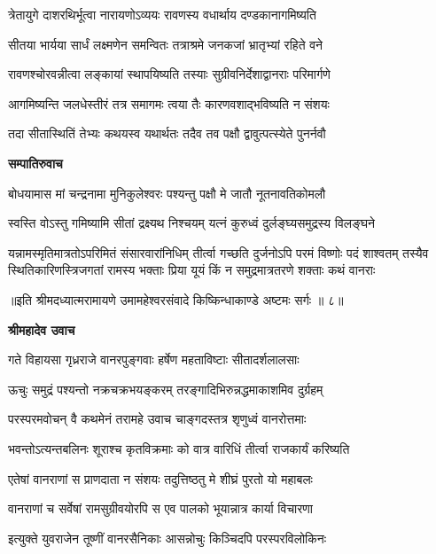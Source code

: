 \twolineshloka
{त्रेतायुगे दाशरथिर्भूत्वा नारायणोऽव्ययः}
{रावणस्य वधार्थाय दण्डकानागमिष्यति} %

\twolineshloka
{सीतया भार्यया सार्धं लक्ष्मणेन समन्वितः}
{तत्राश्रमे जनकजां भ्रातृभ्यां रहिते वने} %

\twolineshloka
{रावणश्चोरवन्नीत्वा लङ्कायां स्थापयिष्यति}
{तस्याः सुग्रीवनिर्देशाद्वानराः परिमार्गणे} %

\twolineshloka
{आगमिष्यन्ति जलधेस्तीरं तत्र समागमः}
{त्वया तैः कारणवशाद्भविष्यति न संशयः} %

\twolineshloka
{तदा सीतास्थितिं तेभ्यः कथयस्व यथार्थतः}
{तदैव तव पक्षौ द्वावुत्पत्स्येते पुनर्नवौ} %

\textbf{सम्पातिरुवाच}

\twolineshloka
{बोधयामास मां चन्द्रनामा मुनिकुलेश्वरः}
{पश्यन्तु पक्षौ मे जातौ नूतनावतिकोमलौ} %

\twolineshloka
{स्वस्ति वोऽस्तु गमिष्यामि सीतां द्रक्ष्यथ निश्चयम्}
{यत्नं कुरुध्वं दुर्लङ्घ्यसमुद्रस्य विलङ्घने} %

\fourlineindentedshloka
{यन्नामस्मृतिमात्रतोऽपरिमितं संसारवारांनिधिम्}
{तीर्त्वा गच्छति दुर्जनोऽपि परमं विष्णोः पदं शाश्वतम्}
{तस्यैव स्थितिकारिणस्त्रिजगतां रामस्य भक्ताः प्रिया}
{यूयं किं न समुद्रमात्रतरणे शक्ताः कथं वानराः} %

{॥इति श्रीमदध्यात्मरामायणे उमामहेश्वरसंवादे किष्किन्धाकाण्डे
अष्टमः सर्गः ॥ ८॥
}




\textbf{श्रीमहादेव उवाच}

\twolineshloka
{गते विहायसा गृध्रराजे वानरपुङ्गवाः}
{हर्षेण महताविष्टाः सीतादर्शलालसाः} %

\twolineshloka
{ऊचुः समुद्रं पश्यन्तो नक्रचक्रभयङ्करम्}
{तरङ्गादिभिरुन्नद्धमाकाशमिव दुर्ग्रहम्} %

\twolineshloka
{परस्परमवोचन् वै कथमेनं तरामहे}
{उवाच चाङ्गदस्तत्र शृणुध्वं वानरोत्तमाः} %

\twolineshloka
{भवन्तोऽत्यन्तबलिनः शूराश्च कृतविक्रमाः}
{को वात्र वारिधिं तीर्त्वा राजकार्यं करिष्यति} %

\twolineshloka
{एतेषां वानराणां स प्राणदाता न संशयः}
{तदुत्तिष्ठतु मे शीघ्रं पुरतो यो महाबलः} %

\twolineshloka
{वानराणां च सर्वेषां रामसुग्रीवयोरपि}
{स एव पालको भूयान्नात्र कार्या विचारणा} %

\twolineshloka
{इत्युक्ते युवराजेन तूष्णीं वानरसैनिकाः}
{आसन्नोचुः किञ्चिदपि परस्परविलोकिनः} %

